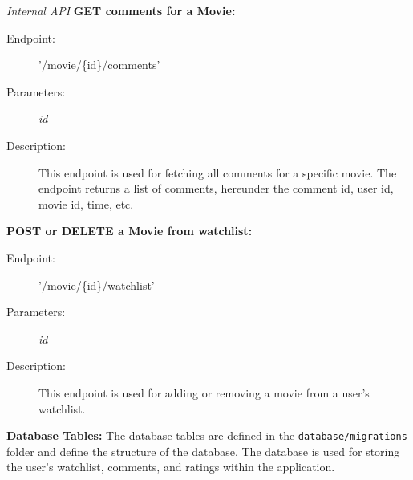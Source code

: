 \textit{Internal API}
\textbf{GET comments for a Movie:}
\begin{description}
    \item [Endpoint:] '/movie/\{id\}/comments'
    \item [Parameters:] \textit{id}
    \item [Description:] This endpoint is used for fetching all comments for a specific movie. The endpoint returns a list of comments, hereunder the comment id, user id, movie id, time, etc.
\end{description}
\textbf{POST or DELETE a Movie from watchlist:}
\begin{description}
    \item [Endpoint:] '/movie/\{id\}/watchlist'
    \item [Parameters:] \textit{id}
    \item [Description:] This endpoint is used for adding or removing a movie from a user's watchlist.
\end{description}


\textbf{Database Tables:}
The database tables are defined in the \texttt{database/migrations} folder and define the structure of the database. The database is used for storing the user's watchlist, comments, and ratings within the application.

